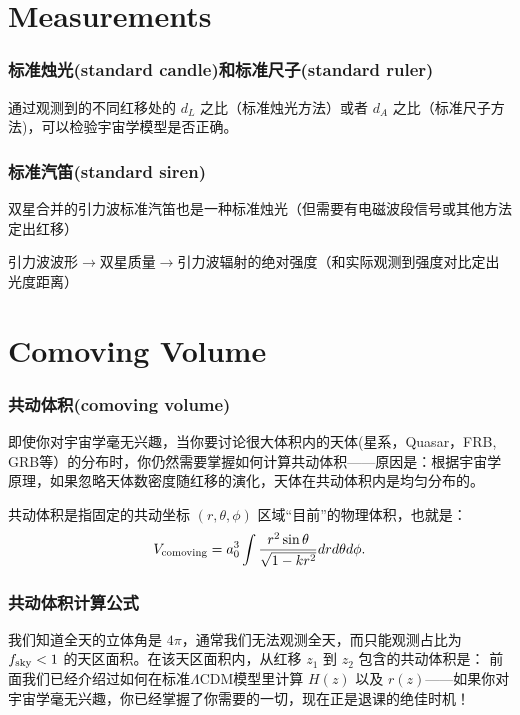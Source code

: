 \documentclass[CJK,13pt]{beamer}
\begin{document}

\section{Measurements}

\begin{frame}
  \frametitle{标准烛光(standard candle)和标准尺子(standard ruler)}

  通过观测到的不同红移处的 $d_L$ 之比（标准烛光方法）或者 $d_A$ 之比（标准尺子方法)，可以检验宇宙学模型是否正确。
\end{frame}


\begin{frame}
  \frametitle{标准汽笛(standard siren)}
  双星合并的引力波标准汽笛也是一种标准烛光（但需要有电磁波段信号或其他方法定出红移）

  

  引力波波形$\rightarrow$双星质量$\rightarrow$引力波辐射的绝对强度（和实际观测到强度对比定出光度距离）
\end{frame}


\section{Comoving Volume}
\begin{frame}
  \frametitle{共动体积(comoving volume)}
  即使你对宇宙学毫无兴趣，当你要讨论很大体积内的天体(星系，Quasar，FRB, GRB等）的分布时，你仍然需要掌握如何计算共动体积——原因是：根据宇宙学原理，如果忽略天体数密度随红移的演化，天体在共动体积内是均匀分布的。

  \skiplines
  
  {\blue 共动体积是指固定的共动坐标 $(r,\theta,\phi)$ 区域“目前”的物理体积}，也就是：
  $$V_{\rm comoving} =  a_0^3\int \frac{r^2\sin\theta}{\sqrt{1-kr^2}} dr d\theta d\phi. $$

\end{frame}

\begin{frame}
  \frametitle{共动体积计算公式}
  我们知道全天的立体角是 $4\pi$，通常我们无法观测全天，而只能观测占比为 $f_{\rm sky}<1$ 的天区面积。在该天区面积内，从红移 $z_1$ 到 $z_2$ 包含的共动体积是：
  前面我们已经介绍过如何在标准$\Lambda$CDM模型里计算 $H(z)$ 以及 $r(z)$——如果你对宇宙学毫无兴趣，你已经掌握了你需要的一切，现在正是退课的绝佳时机！

  \skipline
  
\end{frame}
\end{document}

